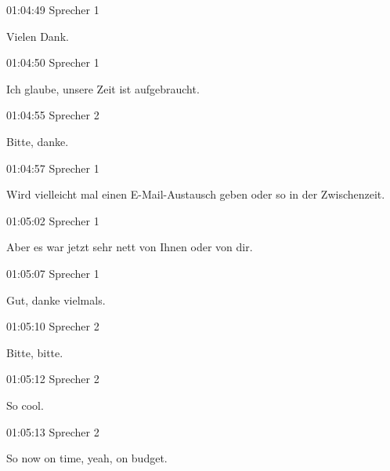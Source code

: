 01:04:49 Sprecher 1

Vielen Dank.

01:04:50 Sprecher 1

Ich glaube, unsere Zeit ist aufgebraucht.

01:04:55 Sprecher 2

Bitte, danke.

01:04:57 Sprecher 1

Wird vielleicht mal einen E-Mail-Austausch geben oder so in der
Zwischenzeit.

01:05:02 Sprecher 1

Aber es war jetzt sehr nett von Ihnen oder von dir.

01:05:07 Sprecher 1

Gut, danke vielmals.

01:05:10 Sprecher 2

Bitte, bitte.

01:05:12 Sprecher 2

So cool.

01:05:13 Sprecher 2

So now on time, yeah, on budget.
